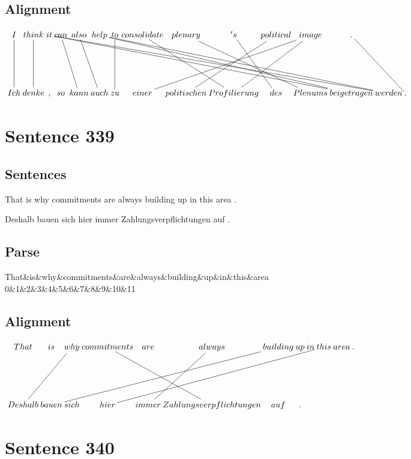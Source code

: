 \documentclass{report}
\begin{document}
\subsection*{Alignment}
\scriptsize{
$
\xymatrix@C-2.3pc{
I \ar @{-} [dd] & think \ar @{-} [dd] & it \ar @{-} [ddrrrrrrrrrrr] \ar @{-} [ddrrrrrrrrrr] & can \ar @{-} [ddr] & also \ar @{-} [ddr] & help \ar @{-} [ddrrrrrrr] \ar @{-} [ddrrrrrrrr] & to \ar @{-} [dd] & consolidate \ar @{-} [ddrr] & plenary \ar @{-} [ddrrr] & 's \ar @{-} [ddr] & political \ar @{-} [ddll] & image \ar @{-} [ddll] \ar @{-} [ddllll] & . \ar @{-} [ddrr]\\\\
Ich & denke & , & so & kann & auch & zu & einer & politischen & Profilierung & des & Plenums & beigetragen & werden & .
}$}
\newpage\section*{Sentence 339}

\subsection*{Sentences}
That is why commitments are always building up in this area .

\noindent Deshalb bauen sich hier immer Zahlungsverpflichtungen auf .



\subsection*{Parse}
\begin{dependency}[theme=simple]
\begin{deptext}[column sep=.5cm, row sep=.1ex]
That\&is\&why\&commitments\&are\&always\&building\&up\&in\&this\&area\\
0\&1\&2\&3\&4\&5\&6\&7\&8\&9\&10\&11\\
\end{deptext}
\end{dependency}


\subsection*{Alignment}
\scriptsize{
$
\xymatrix@C-2.3pc{
That & is & why \ar @{-} [ddll] & commitments \ar @{-} [ddrr] & are & always \ar @{-} [ddl] & building \ar @{-} [ddlllll] & up & in & this \ar @{-} [ddllllll] & area & .\\\\
Deshalb & bauen & sich & hier & immer & Zahlungsverpflichtungen & auf & .
}$}
\newpage\section*{Sentence 340}
\end{document}
